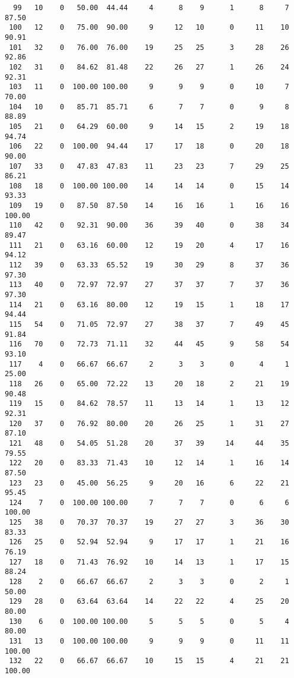 \begin{verbatim}
  99   10    0   50.00  44.44     4      8    9      1      8     7    87.50
 100   12    0   75.00  90.00     9     12   10      0     11    10    90.91
 101   32    0   76.00  76.00    19     25   25      3     28    26    92.86
 102   31    0   84.62  81.48    22     26   27      1     26    24    92.31
 103   11    0  100.00 100.00     9      9    9      0     10     7    70.00
 104   10    0   85.71  85.71     6      7    7      0      9     8    88.89
 105   21    0   64.29  60.00     9     14   15      2     19    18    94.74
 106   22    0  100.00  94.44    17     17   18      0     20    18    90.00
 107   33    0   47.83  47.83    11     23   23      7     29    25    86.21
 108   18    0  100.00 100.00    14     14   14      0     15    14    93.33
 109   19    0   87.50  87.50    14     16   16      1     16    16   100.00
 110   42    0   92.31  90.00    36     39   40      0     38    34    89.47
 111   21    0   63.16  60.00    12     19   20      4     17    16    94.12
 112   39    0   63.33  65.52    19     30   29      8     37    36    97.30
 113   40    0   72.97  72.97    27     37   37      7     37    36    97.30
 114   21    0   63.16  80.00    12     19   15      1     18    17    94.44
 115   54    0   71.05  72.97    27     38   37      7     49    45    91.84
 116   70    0   72.73  71.11    32     44   45      9     58    54    93.10
 117    4    0   66.67  66.67     2      3    3      0      4     1    25.00
 118   26    0   65.00  72.22    13     20   18      2     21    19    90.48
 119   15    0   84.62  78.57    11     13   14      1     13    12    92.31
 120   37    0   76.92  80.00    20     26   25      1     31    27    87.10
 121   48    0   54.05  51.28    20     37   39     14     44    35    79.55
 122   20    0   83.33  71.43    10     12   14      1     16    14    87.50
 123   23    0   45.00  56.25     9     20   16      6     22    21    95.45
 124    7    0  100.00 100.00     7      7    7      0      6     6   100.00
 125   38    0   70.37  70.37    19     27   27      3     36    30    83.33
 126   25    0   52.94  52.94     9     17   17      1     21    16    76.19
 127   18    0   71.43  76.92    10     14   13      1     17    15    88.24
 128    2    0   66.67  66.67     2      3    3      0      2     1    50.00
 129   28    0   63.64  63.64    14     22   22      4     25    20    80.00
 130    6    0  100.00 100.00     5      5    5      0      5     4    80.00
 131   13    0  100.00 100.00     9      9    9      0     11    11   100.00
 132   22    0   66.67  66.67    10     15   15      4     21    21   100.00

\end{verbatim}

